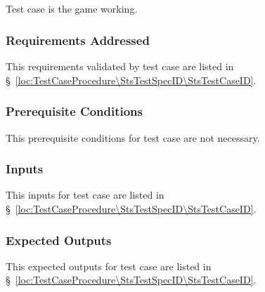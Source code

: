 
\subsection{\StsTestCaseID}
\label{loc:Test\StsTestCaseID}


Test \StsTestSpecID{} case \StsTestCaseID{} is the game working.

\subsubsection{Requirements Addressed}
\label{loc:TestCaseRequirementsAddressed\StsTestSpecID\StsTestCaseID}


This requirements validated by test \StsTestSpecID{} case \StsTestCaseID{} are listed in \S~\ref{loc:TestCaseProcedure\StsTestSpecID\StsTestCaseID}.

\subsubsection{Prerequisite Conditions}
\label{loc:TestCasePrerequisiteConditions\StsTestSpecID\StsTestCaseID}


This prerequisite conditions for test \StsTestSpecID{} case \StsTestCaseID{} are not necessary.

\subsubsection{Inputs}
\label{loc:TestCaseInputs\StsTestSpecID\StsTestCaseID}


This inputs for test \StsTestSpecID{} case \StsTestCaseID{} are listed in \S~\ref{loc:TestCaseProcedure\StsTestSpecID\StsTestCaseID}.

\subsubsection{Expected Outputs}
\label{loc:TestCaseExpectedOutputs\StsTestSpecID\StsTestCaseID}


This expected outputs for test \StsTestSpecID{} case \StsTestCaseID{} are listed in \S~\ref{loc:TestCaseProcedure\StsTestSpecID\StsTestCaseID}.

